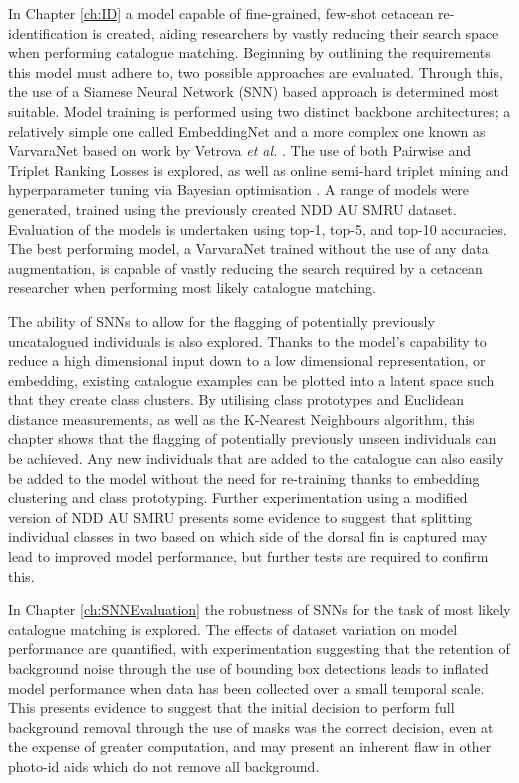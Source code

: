 In Chapter \ref{ch:ID} a model capable of fine-grained, few-shot cetacean re-identification is created, aiding researchers by vastly reducing their search space when performing catalogue matching. Beginning by outlining the requirements this model must adhere to, two possible approaches are evaluated. Through this, the use of a Siamese Neural Network (SNN) based approach is determined most suitable. Model training is performed using two distinct backbone architectures; a relatively simple one called EmbeddingNet and a more complex one known as VarvaraNet based on work by Vetrova \textit{et al.} \cite{vetrova_hidden_2018}. The use of both Pairwise and Triplet Ranking Losses is explored, as well as online semi-hard triplet mining and hyperparameter tuning via Bayesian optimisation \cite{akiba_optuna_2019}. A range of models were generated, trained using the previously created NDD AU SMRU dataset. Evaluation of the models is undertaken using top-1, top-5, and top-10 accuracies. The best performing model, a VarvaraNet trained without the use of any data augmentation, is capable of vastly reducing the search required by a cetacean researcher when performing most likely catalogue matching.

The ability of SNNs to allow for the flagging of potentially previously uncatalogued individuals is also explored. Thanks to the model's capability to reduce a high dimensional input down to a low dimensional representation, or embedding, existing catalogue examples can be plotted into a latent space such that they create class clusters. By utilising class prototypes and Euclidean distance measurements, as well as the K-Nearest Neighbours algorithm, this chapter shows that the flagging of potentially previously unseen individuals can be achieved. Any new individuals that are added to the catalogue can also easily be added to the model without the need for re-training thanks to embedding clustering and class prototyping. Further experimentation using a modified version of NDD AU SMRU presents some evidence to suggest that splitting individual classes in two based on which side of the dorsal fin is captured may lead to improved model performance, but further tests are required to confirm this.

In Chapter \ref{ch:SNNEvaluation} the robustness of SNNs for the task of most likely catalogue matching is explored. The effects of dataset variation on model performance are quantified, with experimentation suggesting that the retention of background noise through the use of bounding box detections leads to inflated model performance when data has been collected over a small temporal scale. This presents evidence to suggest that the initial decision to perform full background removal through the use of masks was the correct decision, even at the expense of greater computation, and may present an inherent flaw in other photo-id aids which do not remove all background. 

